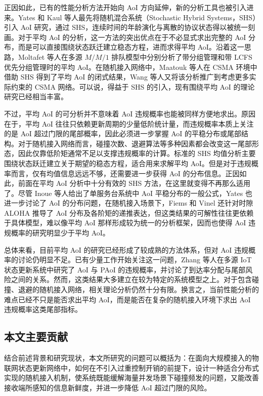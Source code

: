 正因如此，已有的性能分析方法开始向 AoI 方向延伸，新的分析工具也被引入进来。Yates 和 Kaul 等人最先将随机混合系统（Stochastic Hybrid Systems，SHS）引入 AoI 研究，通过 SHS，连续时间的年龄演化与离散的协议状态得以被统一刻画。对于平均 AoI 的分析，这一方法的突出优点在于不必显式求出完整的 AoI 分布，而是可以直接围绕状态跃迁建立稳态方程，进而求得平均 AoI。沿着这一思路，Moltafet 等人在多源 $M/M/1$ 排队模型中分别分析了带分组管理和带 LCFS 优先分组管理时的平均 AoI。在随机接入网络中，Maatouk 等人在 CSMA 环境中借助 SHS 得到了平均 AoI 的闭式结果，Wang 等人又将该分析推广到考虑更多实际约束的 CSMA 网络。可以说，得益于 SHS 的引入，现有围绕平均 AoI 的理论研究已经相当丰富。

不过，平均 AoI 的可分析并不意味着 AoI 违规概率也能被同样方便地求出。原因在于，平均 AoI 往往只依赖更新周期的少量低阶统计量，而违规概率本质上关注的是 AoI 超过门限的尾部概率，因此必须进一步掌握 AoI 的平稳分布或尾部结构。对于随机接入网络而言，碰撞次数、退避算法等多种因素都会改变这一尾部形态，因此仅靠低阶矩通常不足以支撑违规概率的计算。标准的 SHS 均值分析主要围绕状态跃迁建立关于期望的稳态方程，适合用来求解平均 AoI。但是对于违规概率而言，仅有均值信息远远不够，还需要进一步获得 AoI 的分布信息。正因如此，前面在平均 AoI 分析中十分有效的 SHS 方法，在这里就变得不再那么适用了。尽管 Inoue 等人给出了单服务台系统中 AoI 平稳分布的一般公式，Yates 也进一步讨论了 AoI 的分布问题，在随机接入场景下，Fiems 和 Vinel 还针对时隙 ALOHA 推导了 AoI 分布及各阶矩的递推表达，但这类结果的可解性往往更依赖于具体模型，难以像平均 AoI 那样形成较为统一的分析框架，因而也使得 AoI 违规概率的研究明显少于平均 AoI。

总体来看，目前平均 AoI 的研究已经形成了较成熟的方法体系，但对 AoI 违规概率的讨论仍明显不足。已有少量工作开始关注这一问题，Zhang 等人在多源 IoT 状态更新系统中研究了 AoI 与 PAoI 的违规概率，并讨论了到达率分配与尾部风险之间的关系。然而，这类结果大多建立在较为特定的系统模型之上。对于包含碰撞、退避的随机接入网络，相关理论分析仍然十分有限。换言之，当前性能分析的难点已经不只是能否求出平均 AoI，而是能否在复杂的随机接入环境下求出 AoI 违规概率这类尾部指标。

\subsection{本文主要贡献}

结合前述背景和研究现状，本文所研究的问题可以概括为：在面向大规模接入的物联网状态更新网络中，如何在不引入过重控制开销的前提下，设计一种适合分布式实现的随机接入机制，使系统既能缓解海量并发场景下碰撞频发的问题，又能改善接收端所感知的信息新鲜度，并进一步降低 AoI 超过门限的风险。

